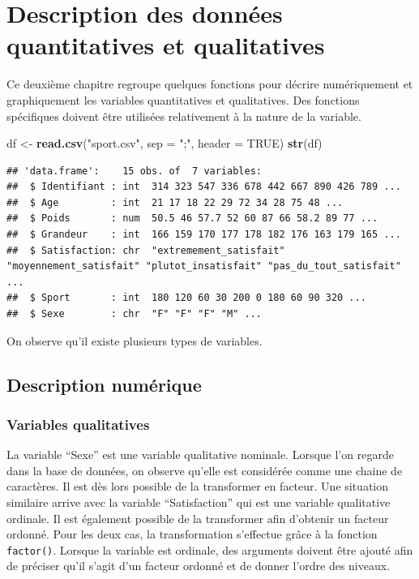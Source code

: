 \documentclass[
]{book}
\newenvironment{Shaded}{\begin{snugshade}}{\end{snugshade}}
\newcommand{\AttributeTok}[1]{\textcolor[rgb]{0.13,0.29,0.53}{#1}}
\newcommand{\ConstantTok}[1]{\textcolor[rgb]{0.56,0.35,0.01}{#1}}
\newcommand{\FunctionTok}[1]{\textcolor[rgb]{0.13,0.29,0.53}{\textbf{#1}}}
\newcommand{\NormalTok}[1]{#1}
\newcommand{\OtherTok}[1]{\textcolor[rgb]{0.56,0.35,0.01}{#1}}
\newcommand{\StringTok}[1]{\textcolor[rgb]{0.31,0.60,0.02}{#1}}
\begin{document}
\chapter{Description des données quantitatives et qualitatives}\label{description-des-donnuxe9es-quantitatives-et-qualitatives}

Ce deuxième chapitre regroupe quelques fonctions pour décrire numériquement et graphiquement les variables quantitatives et qualitatives. Des fonctions spécifiques doivent être utilisées relativement à la nature de la variable.

\begin{Shaded}
\begin{Highlighting}[]
\NormalTok{df }\OtherTok{\textless{}{-}} \FunctionTok{read.csv}\NormalTok{(}\StringTok{"sport.csv"}\NormalTok{, }\AttributeTok{sep =} \StringTok{";"}\NormalTok{, }\AttributeTok{header =} \ConstantTok{TRUE}\NormalTok{)}
\FunctionTok{str}\NormalTok{(df)}
\end{Highlighting}
\end{Shaded}

\begin{verbatim}
## 'data.frame':    15 obs. of  7 variables:
##  $ Identifiant : int  314 323 547 336 678 442 667 890 426 789 ...
##  $ Age         : int  21 17 18 22 29 72 34 28 75 48 ...
##  $ Poids       : num  50.5 46 57.7 52 60 87 66 58.2 89 77 ...
##  $ Grandeur    : int  166 159 170 177 178 182 176 163 179 165 ...
##  $ Satisfaction: chr  "extremement_satisfait" "moyennement_satisfait" "plutot_insatisfait" "pas_du_tout_satisfait" ...
##  $ Sport       : int  180 120 60 30 200 0 180 60 90 320 ...
##  $ Sexe        : chr  "F" "F" "F" "M" ...
\end{verbatim}

On observe qu'il existe plusieurs types de variables.

\section{Description numérique}\label{description-numuxe9rique}

\subsection{Variables qualitatives}\label{variables-qualitatives}

La variable ``Sexe'' est une variable qualitative nominale. Lorsque l'on regarde dans la base de données, on observe qu'elle est considérée comme une chaine de caractères. Il est dès lors possible de la transformer en facteur. Une situation similaire arrive avec la variable ``Satisfaction'' qui est une variable qualitative ordinale. Il est également possible de la transformer afin d'obtenir un facteur ordonné. Pour les deux cas, la transformation s'effectue grâce à la fonction \texttt{factor()}. Lorsque la variable est ordinale, des arguments doivent être ajouté afin de préciser qu'il s'agit d'un facteur ordonné et de donner l'ordre des niveaux.
\end{document}
